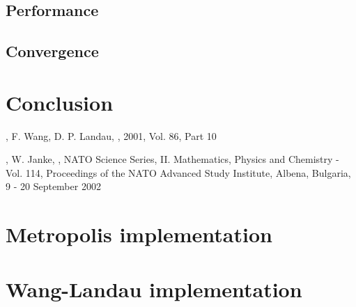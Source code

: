 \documentclass{article}
\begin{document}
\subsection{Performance}
\subsection{Convergence}
\section{Conclusion}
\begin{thebibliography}{9}

,
\newblock F. Wang, D. P. Landau,
, 2001, Vol. 86, Part 10

,
\newblock W. Janke,
, NATO Science Series, II. Mathematics, Physics and Chemistry - Vol. 114, Proceedings of the NATO Advanced Study Institute, Albena, Bulgaria, 9 - 20 September 2002

\end{thebibliography}
\appendix
\section{Metropolis implementation}

\section{Wang-Landau implementation}

\end{document}
